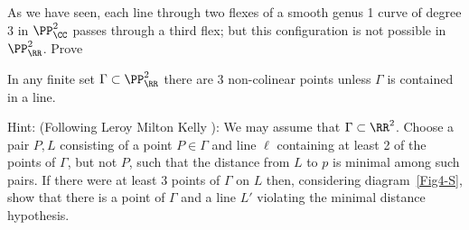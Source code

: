 \begin{exercise}\label{Sylvester-Gallai-Kelly}
As we have seen, each line through two flexes of a smooth genus 1 curve of degree 3 in $\PP^2_\CC$ passes through a third flex; but this configuration is not possible in $\PP^2_\RR$. Prove
\begin{theorem}
In any finite set  $\Gamma \subset \PP^2_\RR$ there are 3 non-colinear points unless $\Gamma$ is contained in a line.
\end{theorem}

Hint: (Following Leroy Milton Kelly ): We may assume that $\Gamma\subset \RR^2$. Choose a pair $P,L$ consisting of a point $P\in \Gamma$ and line $\ell$ containing at least 2 of the points of $\Gamma$, but not $P$, such that the distance from $L$ to $p$ is
minimal among such pairs. If there were at least 3 points of $\Gamma$ on $L$ then, considering  diagram~\ref{Fig4-S}, 
show that
there is a point of $\Gamma$ and a line $L'$ violating the minimal distance hypothesis.
\end{exercise}

